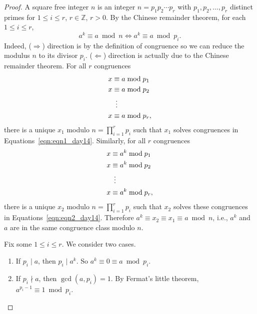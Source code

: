 \documentclass{amsbook}
\theoremstyle{plain}
\theoremstyle{definition}
\theoremstyle{remark}
\numberwithin{equation}{chapter}
\numberwithin{figure}{chapter}
\newcommand{\Z}{\mathbb{Z}}
\begin{document}
\begin{proof}
  A square free integer $n$ is an integer $n = p_1 p_2 \cdots p_r$ with $p_1, p_2, \ldots, p_r$ distinct primes for $1 \leqslant i \leqslant r$, $r \in \Z$, $r > 0$. By the Chinese remainder theorem, for each $1 \leqslant i \leqslant r$,
\[
a^k \equiv a \bmod n \iff a^k \equiv a \bmod p_i.
\]
Indeed, ($\Rightarrow$) direction is by the definition of congruence so we can reduce the modulus $n$ to its divisor $p_i$. ($\Leftarrow$) direction is actually due to the Chinese remainder theorem. For all $r$ congruences
\begin{align}
  \begin{split}\label{eqn:eqn1_day14}
    x &\equiv a \bmod p_1 \\
    x &\equiv a \bmod p_2 \\
    & \hspace{1.7mm} \vdots \\
    x &\equiv a \bmod p_r,
  \end{split}
\end{align}
there is a unique $x_1$ modulo $n = \prod_{i=1}^r p_i$ such that $x_1$ solves congruences in Equations~\eqref{eqn:eqn1_day14}. Similarly, for all $r$ congruences
\begin{align}
  \begin{split}\label{eqn:eqn2_day14}
    x &\equiv a^k \bmod p_1 \\
    x &\equiv a^k \bmod p_2 \\
    & \hspace{1.7mm} \vdots \\
    x &\equiv a^k \bmod p_r,
  \end{split}
\end{align}
there is a unique $x_2$ modulo $n = \prod_{i=1}^r p_i$ such that $x_2$ solves these congruences in Equations~\eqref{eqn:eqn2_day14}. Therefore $a^k \equiv x_2 \equiv x_1 \equiv a \bmod n$, i.e., $a^k$ and $a$ are in the same congruence class modulo $n$.

Fix some $1 \leqslant i \leqslant r$. We consider two cases.
\begin{enumerate}[label=(\roman*)]
\item If $p_i \mid a$, then $p_i \mid a^k$. So $a^k \equiv 0 \equiv a \bmod p_i$.
\item If $p_i \nmid a$, then $\gcd (a, p_i) = 1$. By Fermat's little theorem, $a^{p_i - 1} \equiv 1 \bmod p_i$.


\end{enumerate}
\end{proof}
\end{document}
